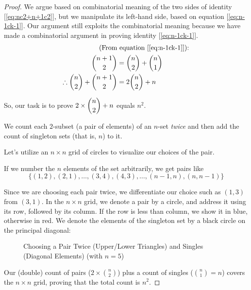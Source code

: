 \documentclass[11pt]{book}
\theoremstyle{definition}
\theoremstyle{plain}
\theoremstyle{definition}
\theoremstyle{problemstyle}
\theoremstyle{remark}
\theoremstyle{definition}
\begin{document}
\begin{proof}
    We argue based on combinatorial meaning of the two sides of identity [\ref{eq:nc2+n+1c2}], but we manipulate its left-hand side, based on equation [\ref{eq:n-1ck-1}]. Our argument still exploits the combinatorial meaning because we have made a combinatorial argument in proving identity [\ref{eq:n-1ck-1}].
    \begin{align*}
        \text{(From}&\text{ equation [\ref{eq:n-1ck-1}]):}\\
        \binom{n+1}{2}&=\binom{n}{2}+\binom{n}{1}\\
        \therefore\binom{n}{2}+\binom{n+1}{2}&=2\binom{n}{2}+n
    \end{align*}

    So, our task is to prove $2\times\dbinom{n}{2}+n$ equals $n^2$.

    We count each $2$-subset (a pair of elements) of an $n$-set \emph{twice} and then add the count of singleton sets (that is, $n$) to it. 

    Let's utilize an $n\times n$ grid of circles to visualize our choices of the pair.

    If we number the $n$ elements of the set arbitrarily, we get pairs like 
    \[
        \{(1,2),(2,1),\dots,(3,4),(4,3),\dots,(n-1,n),(n,n-1)\}
    \]

    Since we are choosing each pair twice, we differentiate our choice such as $(1,3)$ from $(3,1)$. In the $n\times n$ grid, we denote a pair by a circle, and address it using its row, followed by its column. If the row is less than column, we show it in blue, otherwise in red. We denote the elements of the singleton set by a black circle on the principal diagonal:
\begin{figure}[H]
  \centering
    \caption{Choosing a Pair Twice (Upper/Lower Triangles) and Singles (Diagonal Elements) (with $n=5$)}
    \label{fig:nc2+n+1c2}
\end{figure}

    Our (double) count of pairs ($2\times\binom{n}{2}$) plus a count of singles ($\binom{n}{1}=n$) covers the $n\times n$ grid, proving that the total count is $n^2$.

\end{proof}
\end{document}
